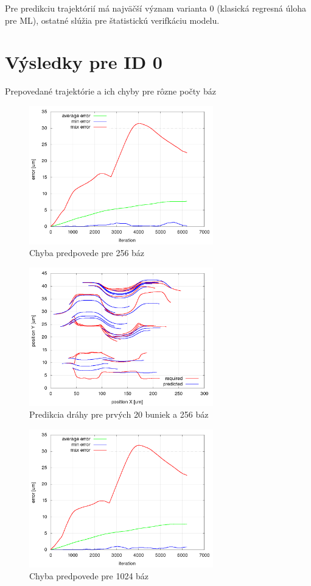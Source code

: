 \documentclass[10pt,a4paper]{article}
\begin{document}
Pre predikciu trajektórií má najväčší význam varianta 0 (klasická regresná úloha pre ML), ostatné slúžia pre štatistickú
verifkáciu modelu.


\section{Výsledky pre ID 0}

Prepovedané trajektórie a ich chyby pre rôzne počty báz

\begin{figure}[!ht]
\centering
\includegraphics[width=8cm]{images/kanal_kika_sim6/256_basis/summary_error_during_trajectory_reconstruction.png}
\caption{Chyba predpovede pre 256 báz}
\label{img:id_0_prediction_error_256_basis}
\end{figure}

\begin{figure}[!ht]
\centering
\includegraphics[width=8cm]{images/kanal_kika_sim6/256_basis/trajectory_prediction_for_20_cells.png}
\caption{Predikcia dráhy pre prvých 20 buniek a 256 báz}
\label{img:id_0_prediction_256_basis}
\end{figure}

\begin{figure}[!ht]
\centering
\includegraphics[width=8cm]{images/kanal_kika_sim6/1024_basis/summary_error_during_trajectory_reconstruction.png}
\caption{Chyba predpovede pre 1024 báz}
\label{img:id_0_prediction_error_1024_basis}
\end{figure}
\end{document}
